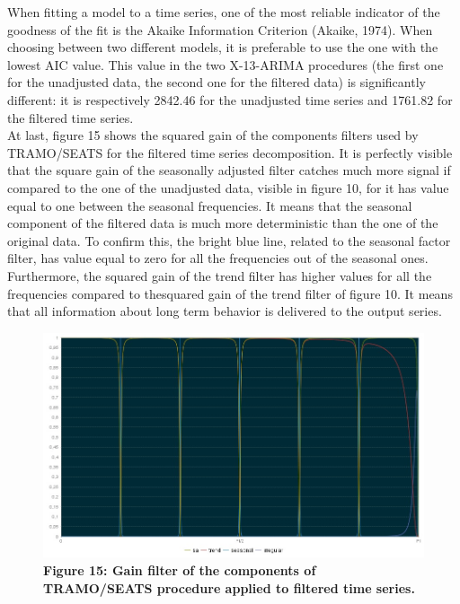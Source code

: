 \documentclass{article}
\begin{document}
When fitting a model to a time series, one of the most reliable indicator of the goodness of the fit is the Akaike Information Criterion (Akaike, 1974). When choosing between two different models, it is preferable to use the one with the lowest AIC value. This value in the two X-13-ARIMA procedures (the first one for the unadjusted data, the second one for the filtered data) is significantly different: it is respectively 2842.46 for the unadjusted time series and 1761.82 for the filtered time series.\\At last, figure 15 shows the squared gain of the components filters used by TRAMO/SEATS for the filtered time series decomposition. It is perfectly visible that the square gain of the seasonally adjusted filter catches much more signal if compared to the one of the unadjusted data, visible in figure 10, for it has value equal to one between the seasonal frequencies. It means that the seasonal component of the filtered data is much more deterministic than the one of the original data. To confirm this, the bright blue line, related to the seasonal factor filter, has value equal to zero for all the frequencies out of the seasonal ones. Furthermore, the squared gain of the trend filter has higher values for all the frequencies compared to thesquared gain of the trend filter of figure 10. It means that all information about long term behavior is delivered to the output series.
\begin{figure}[H]
  \includegraphics[width=\textwidth]{../images/capitolo4/gainfilters.jpg}
  {\textbf{\scriptsize Figure 15: Gain filter of the components of TRAMO/SEATS procedure applied to filtered time series.}}
\end{figure}
\end{document}
